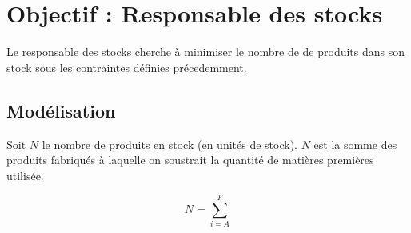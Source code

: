 \newpage
\section{Objectif : Responsable des stocks}
Le responsable des stocks cherche à minimiser le nombre de de produits dans
son stock sous les contraintes définies précedemment.

\subsection{Modélisation}
Soit $N$ le nombre de produits en stock (en unités de stock). $N$ est la somme
des produits fabriqués à laquelle on soustrait la quantité de matières premières
utilisée.

\begin{equation}
	N = \sum_{i = A}^{F}
\end{equation} 